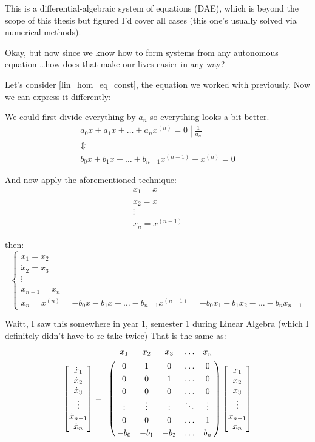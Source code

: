 This is a differential-algebraic system of equations (DAE), which is beyond the scope of this thesis but figured I'd cover all cases (this one's usually solved via numerical methods).

Okay, but now since we know how to form systems from any autonomous equation \dots how does that make our lives easier in any way?

Let's consider \ref{lin_hom_eq_const}, the equation we worked with previously. Now we can express it differently:

We could first divide everything by $a_{n}$ so everything looks a bit better.
\begin{gather*}
	\left. a_0 x + a_1\dot{x}+ \dots +a_{n} x^{(n)} = 0 \middle| \frac{1}{a_{n}} \right. \\
	\Updownarrow \\
	b_0 x + b_1\dot{x} + \dots + b_{n-1} x^{(n-1)} + x^{(n)} = 0
\end{gather*}

And now apply the aforementioned technique:
\begin{gather*}
	x_1 = x     \\
	x_2 = \dot{x} \\
	\vdots \\
	x_n = x^{(n-1)}
\end{gather*}

then:
\[
	\begin{cases}
		\dot{x}_1 = x_2     \\
		\dot{x}_2 = x_3     \\
		\vdots              \\
		\dot{x}_{n-1} = x_n \\
		\dot{x}_n  = x^{(n)} = -b_0x - b_1\dot{x} - \dots - b_{n-1} x^{(n-1)} = -b_0 x_1 - b_1 x_2 - \dots - b_n x_{n-1}
	\end{cases}
\]

Waitt, I saw this somewhere in year 1, semester 1 during Linear Algebra (which I definitely didn't have to re-take twice)
That is the same as:
\begin{align*}
	\begin{bmatrix}
		\dot{x}_1     \\
		\dot{x}_2     \\
		\dot{x}_3     \\
		\vdots        \\
		\dot{x}_{n-1} \\
		\dot{x}_n
	\end{bmatrix} =
	\bordermatrix{ & x_1    & x_2    & x_3    & \ldots & x_n \cr
		& 0      & 1      & 0      & \ldots & 0 \cr
		& 0      & 0      & 1      & \ldots & 0 \cr
		& 0      & 0      & 0      & \ldots & 0 \cr
		& \vdots & \vdots & \vdots & \ddots & \vdots \cr
		& 0      & 0      & 0      & \ldots & 1 \cr
	& -b_0   & -b_1   & -b_2   & \ldots & b_n }
	\begin{bmatrix}
		x_1     \\
		x_2     \\
		x_3     \\
		\vdots  \\
		x_{n-1} \\
		x_n
	\end{bmatrix}
\end{align*}

